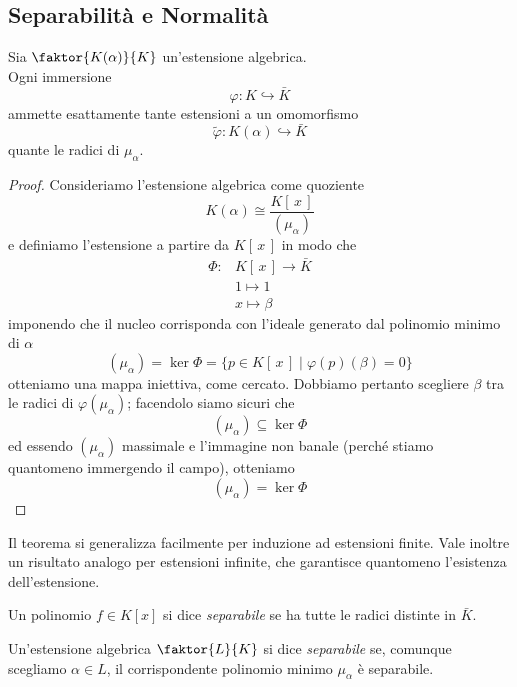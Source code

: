 \subsection{Separabilità e Normalità}
\begin{multicols}{2}
	
	\begin{theorem}\label{est}
		Sia $ \faktor{K(\alpha)}{K} $ un'estensione algebrica.\\ Ogni immersione
		\[ \varphi: K \hookrightarrow \bar{K} \]
		ammette esattamente tante estensioni a un omomorfismo
		\[ \tilde{\varphi}: K(\alpha) \hookrightarrow \bar{K} \]
		 quante le radici di $ \mu_\alpha $.
	\end{theorem}
	\begin{proof}
		Consideriamo l'estensione algebrica come quoziente
		\[ K(\alpha) \cong \frac{K[\, x \,]}{(\mu_\alpha)} \]
		e definiamo l'estensione a partire da $ K[\, x \,] $ in modo che
		\begin{align*}
		\Phi\colon &K[\, x \,] \to \bar{K} \\
		& 1 \mapsto 1 \\
		& x \mapsto \beta 
		\end{align*}
		imponendo che il nucleo corrisponda con l'ideale generato dal polinomio minimo di $ \alpha $
		\[ (\mu_\alpha) = \ker{\Phi} = \{ p \in K[\, x \,] \mid \varphi(p)(\beta) = 0 \} \]
		otteniamo una mappa iniettiva, come cercato.
		Dobbiamo pertanto scegliere $ \beta $ tra le radici di $ \varphi(\mu_\alpha) $; facendolo siamo sicuri che
		\[ (\mu_\alpha) \subseteq \ker{\Phi} \]
		ed essendo $ (\mu_\alpha) $ massimale e l'immagine non banale (perché stiamo quantomeno immergendo il campo), otteniamo
		\[ (\mu_\alpha) = \ker{\Phi} \]
	\end{proof}
	\begin{remark}
		Il teorema si generalizza facilmente per induzione ad estensioni finite. Vale inoltre un risultato analogo per estensioni infinite, che garantisce quantomeno l'esistenza dell'estensione.
	\end{remark}


	\begin{definition}[Separabile]
		Un polinomio $ f \in K[x] $ si dice \emph{separabile} se ha tutte le radici distinte in $ \bar{K} $.
		
		Un'estensione algebrica $ \faktor{L}{K} $ si dice \emph{separabile} se, comunque scegliamo $\alpha \in L  $, il corrispondente polinomio minimo $ \mu_\alpha $ è separabile.
	\end{definition}


\end{multicols}
